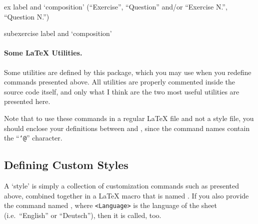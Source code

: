 \documentclass[11pt,a4paper]{article}
\begin{document}





ex label and `composition' (``Exercise'', ``Question'' and/or ``Exercise N.'', ``Question N.'')

subexercise label and `composition'


\paragraph{Some \LaTeX{} Utilities.} Some utilities are defined by this package,
which you may use when you redefine commands presented above.
All utilities are properly commented inside the source code itself, and only what I think
are the two most useful utilities are presented here.

Note that to use these
commands in a regular \LaTeX{} file and not a style file, you should enclose your
definitions between  and , since the command
names contain the ``\texttt{\char`@}'' character.





\subsection{Defining Custom Styles}
\label{sec:customstyles}

A `style' is simply a collection of customization commands such as presented above,
combined together in a \LaTeX{} macro that is named
. If you also provide the command named
, where \texttt{<Language>} is the
language of the sheet (i.e.\ ``English'' or ``Deutsch''), then it is called, too.
\end{document}
